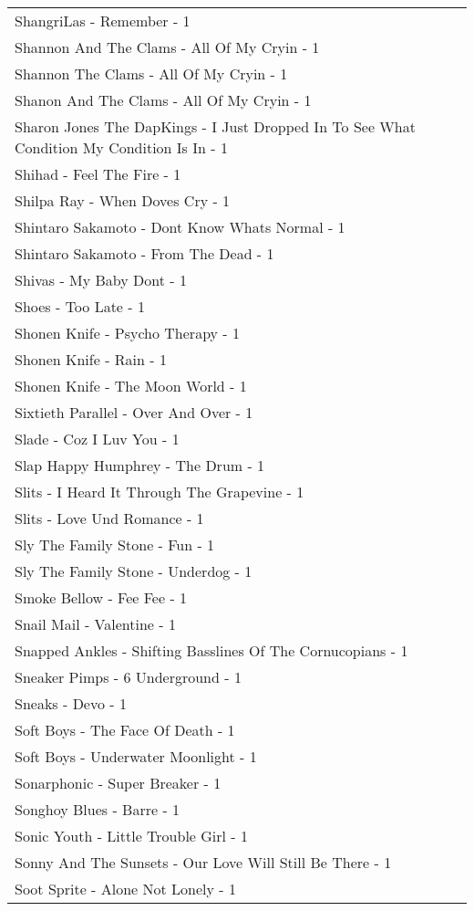 \documentclass[
]{article}
\begin{document}
\begin{longtable}{l}
ShangriLas - Remember - 1 \\ 
Shannon And The Clams - All Of My Cryin - 1 \\ 
Shannon The Clams - All Of My Cryin - 1 \\ 
Shanon And The Clams - All Of My Cryin - 1 \\ 
Sharon Jones The DapKings - I Just Dropped In To See What Condition My Condition Is In - 1 \\ 
Shihad - Feel The Fire - 1 \\ 
Shilpa Ray - When Doves Cry - 1 \\ 
Shintaro Sakamoto - Dont Know Whats Normal - 1 \\ 
Shintaro Sakamoto - From The Dead - 1 \\ 
Shivas - My Baby Dont - 1 \\ 
Shoes - Too Late - 1 \\ 
Shonen Knife - Psycho Therapy - 1 \\ 
Shonen Knife - Rain - 1 \\ 
Shonen Knife - The Moon World - 1 \\ 
Sixtieth Parallel - Over And Over - 1 \\ 
Slade - Coz I Luv You - 1 \\ 
Slap Happy Humphrey - The Drum - 1 \\ 
Slits - I Heard It Through The Grapevine - 1 \\ 
Slits - Love Und Romance - 1 \\ 
Sly The Family Stone - Fun - 1 \\ 
Sly The Family Stone - Underdog - 1 \\ 
Smoke Bellow - Fee Fee - 1 \\ 
Snail Mail - Valentine - 1 \\ 
Snapped Ankles - Shifting Basslines Of The Cornucopians - 1 \\ 
Sneaker Pimps - 6 Underground - 1 \\ 
Sneaks - Devo - 1 \\ 
Soft Boys - The Face Of Death - 1 \\ 
Soft Boys - Underwater Moonlight - 1 \\ 
Sonarphonic - Super Breaker - 1 \\ 
Songhoy Blues - Barre - 1 \\ 
Sonic Youth - Little Trouble Girl - 1 \\ 
Sonny And The Sunsets - Our Love Will Still Be There - 1 \\ 
Soot Sprite - Alone Not Lonely - 1 \\ 

\end{longtable}
\end{document}
